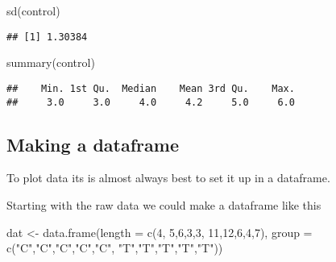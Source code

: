 \documentclass[
]{book}
\newenvironment{Shaded}{\begin{snugshade}}{\end{snugshade}}
\newcommand{\AttributeTok}[1]{\textcolor[rgb]{0.77,0.63,0.00}{#1}}
\newcommand{\DecValTok}[1]{\textcolor[rgb]{0.00,0.00,0.81}{#1}}
\newcommand{\FunctionTok}[1]{\textcolor[rgb]{0.00,0.00,0.00}{#1}}
\newcommand{\NormalTok}[1]{#1}
\newcommand{\OtherTok}[1]{\textcolor[rgb]{0.56,0.35,0.01}{#1}}
\newcommand{\StringTok}[1]{\textcolor[rgb]{0.31,0.60,0.02}{#1}}
\begin{document}
\begin{Shaded}
\begin{Highlighting}[]
\FunctionTok{sd}\NormalTok{(control)}
\end{Highlighting}
\end{Shaded}

\begin{verbatim}
## [1] 1.30384
\end{verbatim}

\begin{Shaded}
\begin{Highlighting}[]
\FunctionTok{summary}\NormalTok{(control)}
\end{Highlighting}
\end{Shaded}

\begin{verbatim}
##    Min. 1st Qu.  Median    Mean 3rd Qu.    Max. 
##     3.0     3.0     4.0     4.2     5.0     6.0
\end{verbatim}

\hypertarget{making-a-dataframe}{%
\subsection{Making a dataframe}\label{making-a-dataframe}}

To plot data its is almost always best to set it up in a dataframe.

Starting with the raw data we could make a dataframe like this

\begin{Shaded}
\begin{Highlighting}[]
\NormalTok{dat }\OtherTok{\textless{}{-}} \FunctionTok{data.frame}\NormalTok{(}\AttributeTok{length =} \FunctionTok{c}\NormalTok{(}\DecValTok{4}\NormalTok{,  }\DecValTok{5}\NormalTok{,}\DecValTok{6}\NormalTok{,}\DecValTok{3}\NormalTok{,}\DecValTok{3}\NormalTok{,}
                             \DecValTok{11}\NormalTok{,}\DecValTok{12}\NormalTok{,}\DecValTok{6}\NormalTok{,}\DecValTok{4}\NormalTok{,}\DecValTok{7}\NormalTok{),}
                  \AttributeTok{group =} \FunctionTok{c}\NormalTok{(}\StringTok{"C"}\NormalTok{,}\StringTok{"C"}\NormalTok{,}\StringTok{"C"}\NormalTok{,}\StringTok{"C"}\NormalTok{,}\StringTok{"C"}\NormalTok{,}
                            \StringTok{"T"}\NormalTok{,}\StringTok{"T"}\NormalTok{,}\StringTok{"T"}\NormalTok{,}\StringTok{"T"}\NormalTok{,}\StringTok{"T"}\NormalTok{))}
\end{Highlighting}
\end{Shaded}
\end{document}
